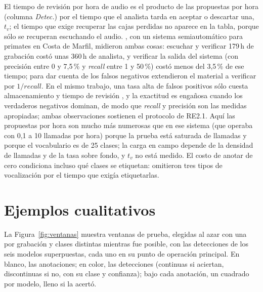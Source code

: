 \documentclass[12pt,a4paper]{article}
\begin{document}
 El tiempo de revisión por hora de audio es el producto de las
propuestas por hora (columna \emph{Detec.}) por el tiempo que el analista tarda en aceptar o
descartar una, $t_v$; el tiempo que exige recuperar las cajas perdidas no aparece en la tabla,
porque sólo se recuperan escuchando el audio. \citet{heinicke_2015}, con un sistema
semiautomático para primates en Costa de Marfil, midieron ambas cosas: escuchar y verificar
179\,h de grabación costó unas 360\,h de analista, y verificar la salida del sistema (con
precisión entre 0 y 7,5\,\% y \textit{recall} entre 1 y 50\,\%) costó menos del 3,5\,\% de
ese tiempo; para dar cuenta de los falsos negativos extendieron el material a verificar por
$1/\textit{recall}$. En el mismo trabajo, una tasa alta de falsos positivos sólo cuesta
almacenamiento y tiempo de revisión \citep{blumstein_acoustic_2011}, y la exactitud es
engañosa cuando los verdaderos negativos dominan, de modo que \textit{recall} y precisión son
las medidas apropiadas; ambas observaciones sostienen el protocolo de RE2.1. Aquí las
propuestas por hora son mucho más numerosas que en ese sistema (que operaba con 0,1 a 10
llamadas por hora) porque la prueba está saturada de llamadas y porque el vocabulario es de
25 clases; la carga en campo depende de la densidad de llamadas y de la tasa sobre fondo, y
$t_v$ no está medido.   El costo de anotar de cero condiciona incluso qué clases se etiquetan:
\citet{escobar-amado_computer_2024} omitieron tres tipos de vocalización por el tiempo que
exigía etiquetarlas.

\section{Ejemplos cualitativos}

La Figura~\ref{fig:ventanas} muestra \nShown{} ventanas de prueba, elegidas al azar con una
por grabación y clases distintas mientras fue posible, con las detecciones de los seis
modelos superpuestas, cada uno en su punto de operación principal. En blanco, las
anotaciones; en color, las detecciones (continuas si aciertan, discontinuas si no, con su
clase y confianza); bajo cada anotación, un cuadrado por modelo, lleno si la acertó.
\end{document}
